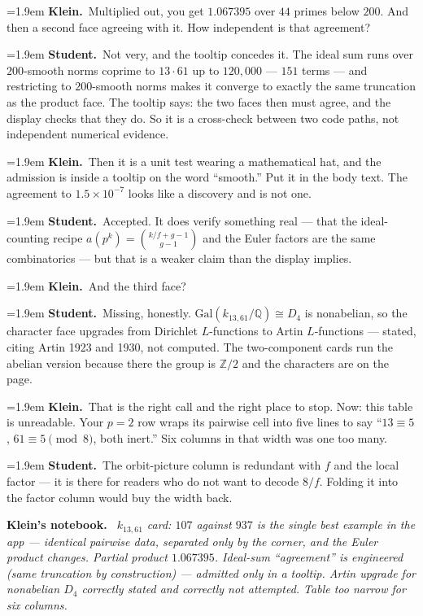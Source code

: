 \documentclass[11pt]{article}
\newcommand{\Stu}[1]{\par\smallskip\noindent\hangindent=1.9em\hangafter=1%
  \textcolor{stucol}{\textbf{Student.}}~#1\par}
\newcommand{\Kle}[1]{\par\smallskip\noindent\hangindent=1.9em\hangafter=1%
  \textcolor{klecol}{\textbf{Klein.}}~#1\par}
\newenvironment{knote}%
  {\begin{snugshade}\small\noindent\textbf{\textcolor{klecol}{Klein's notebook.}}\itshape\ }%
  {\end{snugshade}}
\begin{document}
\Kle{Multiplied out, you get $1.067395$ over $44$ primes below $200$. And then a second face agreeing with it. How independent is that agreement?}

\Stu{Not very, and the tooltip concedes it. The ideal sum runs over $200$-smooth norms coprime to $13 \cdot 61$ up to $120{,}000$ --- $151$ terms --- and restricting to $200$-smooth norms makes it converge to exactly the same truncation as the product face. The tooltip says: the two faces then must agree, and the display checks that they do. So it is a cross-check between two code paths, not independent numerical evidence.}

\Kle{Then it is a unit test wearing a mathematical hat, and the admission is inside a tooltip on the word ``smooth.'' Put it in the body text. The agreement to $1.5 \times 10^{-7}$ looks like a discovery and is not one.}

\Stu{Accepted. It does verify something real --- that the ideal-counting recipe $a(p^k) = \binom{k/f + g - 1}{g-1}$ and the Euler factors are the same combinatorics --- but that is a weaker claim than the display implies.}

\Kle{And the third face?}

\Stu{Missing, honestly. $\mathrm{Gal}(k_{13,61}/\mathbb{Q}) \cong D_4$ is nonabelian, so the character face upgrades from Dirichlet $L$-functions to Artin $L$-functions --- stated, citing Artin 1923 and 1930, not computed. The two-component cards run the abelian version because there the group is $\mathbb{Z}/2$ and the characters are on the page.}

\Kle{That is the right call and the right place to stop. Now: this table is unreadable. Your $p = 2$ row wraps its pairwise cell into five lines to say ``$13 \equiv 5$, $61 \equiv 5 \pmod 8$, both inert.'' Six columns in that width was one too many.}

\Stu{The orbit-picture column is redundant with $f$ and the local factor --- it is there for readers who do not want to decode $8/f$. Folding it into the factor column would buy the width back.}

\begin{knote}
$k_{13,61}$ card: $107$ against $937$ is the single best example in the app --- identical pairwise data, separated only by the corner, and the Euler product changes. Partial product $1.067395$. Ideal-sum ``agreement'' is engineered (same truncation by construction) --- admitted only in a tooltip. Artin upgrade for nonabelian $D_4$ correctly stated and correctly not attempted. Table too narrow for six columns.
\end{knote}
\end{document}
